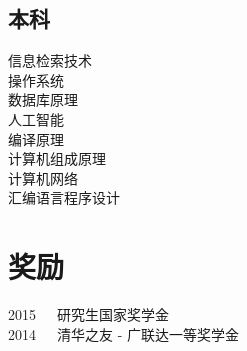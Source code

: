 \documentclass[]{resume_zh}
\begin{document}
\begin{minipage}[t]{0.3\textwidth}
\subsection{本科}
信息检索技术\\
操作系统\\
数据库原理\\
人工智能\\
编译原理\\
计算机组成原理\\
计算机网络\\
汇编语言程序设计\\
\sectionsep




\section{奖励} 
2015~~~研究生国家奖学金\\
2014~~~清华之友 - 广联达一等奖学金\\
\sectionsep

%
%

\end{minipage} 
\hfill
\end{document}
